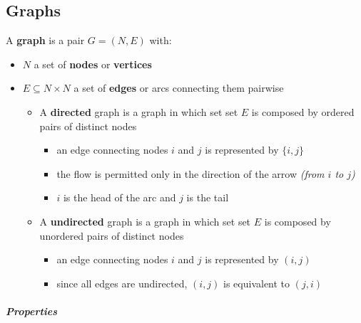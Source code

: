 \documentclass[english]{article}
\begin{document}
\subsection{Graphs}

A \textbf{graph} is a pair \(G = (N, E)\) with:

\begin{itemize}
  \item \(N\) a set of \textbf{nodes} or \textbf{vertices}
  \item \(E \subseteq N \times N\) a set of \textbf{edges} or arcs connecting them pairwise
        \begin{itemize}
          \item A \textbf{directed} graph is a graph in which set set \(E\) is composed by ordered pairs of distinct nodes
                \begin{itemize}[label=\(\rightarrow\)]
                  \item an edge connecting nodes \(i\) and \(j\) is represented by \(\{i, j\}\)
                  \item the flow is permitted only in the direction of the arrow \textit{(from \(i\) to \(j\))}
                  \item \(i\) is the head of the arc and \(j\) is the tail
                \end{itemize}
          \item A \textbf{undirected} graph is a graph in which set set \(E\) is composed by unordered pairs of distinct nodes
                \begin{itemize}[label=\(\rightarrow\)]
                  \item an edge connecting nodes \(i\) and \(j\) is represented by \((i, j)\)
                  \item since all edges are undirected, \((i, j)\) is equivalent to \((j, i)\)
                \end{itemize}
        \end{itemize}
\end{itemize}

\subparagraph*{Properties}
\end{document}
